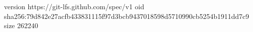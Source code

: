 version https://git-lfs.github.com/spec/v1
oid sha256:79d842e27acfb433831115f97d3bcb9437018598d5710990cb5254b1911dd7c9
size 262240
